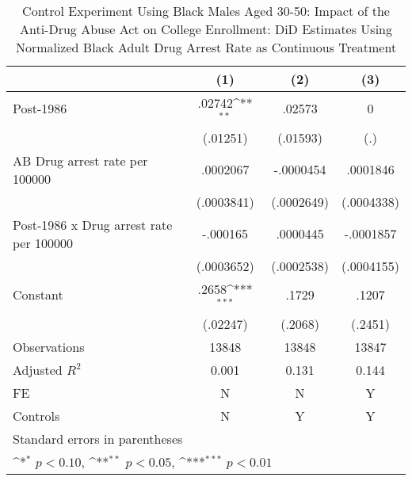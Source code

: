\begin{table}[htbp]\centering
\def\sym#1{\ifmmode^{#1}\else\(^{#1}\)\fi}
\caption{Control Experiment Using Black Males Aged 30-50: Impact of the Anti-Drug Abuse Act on College Enrollment: DiD Estimates Using Normalized Black Adult Drug Arrest Rate as Continuous Treatment}
\begin{tabular}{l*{3}{c}}
\hline\hline
                    &\multicolumn{1}{c}{(1)}         &\multicolumn{1}{c}{(2)}         &\multicolumn{1}{c}{(3)}         \\
\hline
Post-1986           &      .02742\sym{**} &      .02573         &           0         \\
                    &    (.01251)         &    (.01593)         &         (.)         \\
[1em]
AB Drug arrest rate per 100000&    .0002067         &   -.0000454         &    .0001846         \\
                    &  (.0003841)         &  (.0002649)         &  (.0004338)         \\
[1em]
Post-1986 x Drug arrest rate per 100000&    -.000165         &    .0000445         &   -.0001857         \\
                    &  (.0003652)         &  (.0002538)         &  (.0004155)         \\
[1em]
Constant            &       .2658\sym{***}&       .1729         &       .1207         \\
                    &    (.02247)         &     (.2068)         &     (.2451)         \\
\hline
Observations        &       13848         &       13848         &       13847         \\
Adjusted \(R^{2}\)  &       0.001         &       0.131         &       0.144         \\
FE                  &           N         &           N         &           Y         \\
Controls            &           N         &           Y         &           Y         \\
\hline\hline
\multicolumn{4}{l}{\footnotesize Standard errors in parentheses}\\
\multicolumn{4}{l}{\footnotesize \sym{*} \(p<0.10\), \sym{**} \(p<0.05\), \sym{***} \(p<0.01\)}\\
\end{tabular}
\end{table}
